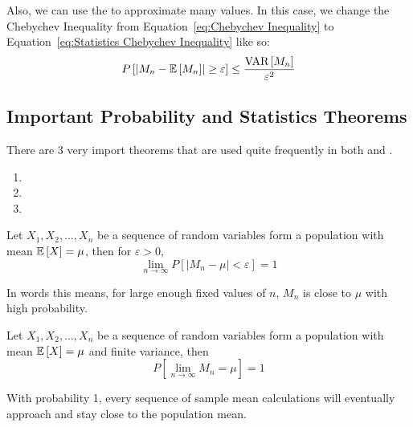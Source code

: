 	Also, we can use the  to approximate many values. In this case, we change the Chebychev Inequality from Equation~\eqref{eq:Chebychev Inequality} to Equation~\eqref{eq:Statistics Chebychev Inequality} like so:
		\begin{equation} \label{eq:Statistics Chebychev Inequality}
			P \left[ \lvert M_{n} - \operatorname{\mathbb{E}} \left[ M_{n} \right] \rvert \geq \varepsilon \right] \leq \frac{\operatorname{\text{VAR}} \left[ M_{n} \right]}{\varepsilon^{2}}
		\end{equation}
		
	\subsection{Important Probability and Statistics Theorems} \label{subsec:Important Probability and Statistics Theorems}
		There are 3 very import theorems that are used quite frequently in both  and .
		\begin{enumerate}
			\item 
			\item 
			\item 
		\end{enumerate}
		\begin{theorem} \label{thm:Weak Law of Large Numbers}
			Let $X_{1},X_{2},\ldots,X_{n}$ be a sequence of  random variables form a population with mean $\operatorname{\mathbb{E}} \left[ X \right] = \mu$, then for $\varepsilon > 0$,
			\begin{equation} \label{eq:Weak Law of Large Numbers}
				\lim\limits_{n \rightarrow \infty} P \left[ \lvert M_{n} - \mu \rvert < \varepsilon \right] = 1
			\end{equation}
			\begin{remark*}
				In words this means, for large enough fixed values of $n$, $M_{n}$ is close to $\mu$ with high probability.
			\end{remark*}
		\end{theorem}
		\begin{theorem} \label{thm:Strong Law of Large Numbers}
			Let $X_{1},X_{2},\ldots,X_{n}$ be a sequence of  random variables form a population with mean $\operatorname{\mathbb{E}} \left[ X \right] = \mu$ and finite variance, then
			\begin{equation} \label{eq:Strong Law of Large Numbers}
				P \left[ \lim\limits_{n \rightarrow \infty} M_{n} = \mu \right] = 1
			\end{equation}
			\begin{remark*}
				With probability 1, every sequence of sample mean calculations will eventually approach and stay close to the population mean.
			\end{remark*}
		\end{theorem}
